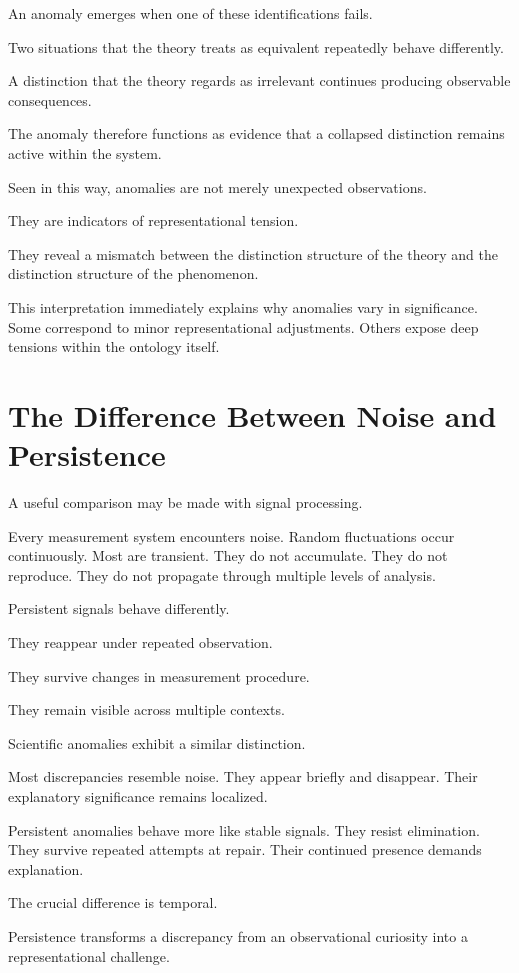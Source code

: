 \documentclass[11pt,oneside,openany]{book}
\begin{document}
An anomaly emerges when one of these identifications fails.

Two situations that the theory treats as equivalent repeatedly behave differently.

A distinction that the theory regards as irrelevant continues producing observable consequences.

The anomaly therefore functions as evidence that a collapsed distinction remains active within the system.

Seen in this way, anomalies are not merely unexpected observations.

They are indicators of representational tension.

They reveal a mismatch between the distinction structure of the theory and the distinction structure of the phenomenon.

This interpretation immediately explains why anomalies vary in significance. Some correspond to minor representational adjustments. Others expose deep tensions within the ontology itself.

\section{The Difference Between Noise and Persistence}

A useful comparison may be made with signal processing.

Every measurement system encounters noise. Random fluctuations occur continuously. Most are transient. They do not accumulate. They do not reproduce. They do not propagate through multiple levels of analysis.

Persistent signals behave differently.

They reappear under repeated observation.

They survive changes in measurement procedure.

They remain visible across multiple contexts.

Scientific anomalies exhibit a similar distinction.

Most discrepancies resemble noise. They appear briefly and disappear. Their explanatory significance remains localized.

Persistent anomalies behave more like stable signals. They resist elimination. They survive repeated attempts at repair. Their continued presence demands explanation.

The crucial difference is temporal.

Persistence transforms a discrepancy from an observational curiosity into a representational challenge.
\end{document}
